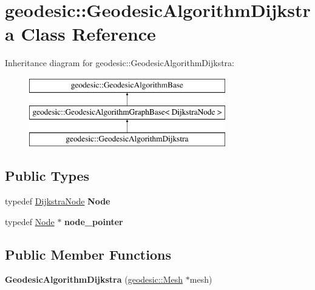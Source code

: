 \hypertarget{classgeodesic_1_1_geodesic_algorithm_dijkstra}{}\section{geodesic\+:\+:Geodesic\+Algorithm\+Dijkstra Class Reference}
\label{classgeodesic_1_1_geodesic_algorithm_dijkstra}
Inheritance diagram for geodesic\+:\+:Geodesic\+Algorithm\+Dijkstra\+:\begin{figure}[H]
\begin{center}
\leavevmode
\includegraphics[height=3.000000cm]{classgeodesic_1_1_geodesic_algorithm_dijkstra}
\end{center}
\end{figure}
\subsection*{Public Types}
\begin{DoxyCompactItemize}
\item 
\hypertarget{classgeodesic_1_1_geodesic_algorithm_dijkstra_a457ff6fabaa767aea932160514c06b72}{}typedef \hyperlink{classgeodesic_1_1_dijkstra_node}{Dijkstra\+Node} {\bfseries Node}\label{classgeodesic_1_1_geodesic_algorithm_dijkstra_a457ff6fabaa767aea932160514c06b72}

\item 
\hypertarget{classgeodesic_1_1_geodesic_algorithm_dijkstra_ab534a34c7d8c4cd92743777c07a31dc5}{}typedef \hyperlink{classgeodesic_1_1_dijkstra_node}{Node} $\ast$ {\bfseries node\+\_\+pointer}\label{classgeodesic_1_1_geodesic_algorithm_dijkstra_ab534a34c7d8c4cd92743777c07a31dc5}

\end{DoxyCompactItemize}
\subsection*{Public Member Functions}
\begin{DoxyCompactItemize}
\item 
\hypertarget{classgeodesic_1_1_geodesic_algorithm_dijkstra_ae07f68dafa762828a23e31c6415947ae}{}{\bfseries Geodesic\+Algorithm\+Dijkstra} (\hyperlink{classgeodesic_1_1_mesh}{geodesic\+::\+Mesh} $\ast$mesh)\label{classgeodesic_1_1_geodesic_algorithm_dijkstra_ae07f68dafa762828a23e31c6415947ae}

\end{DoxyCompactItemize}
